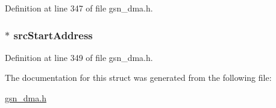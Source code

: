 Definition at line 347 of file gsn\_\-dma.h.

\hypertarget{a00051_a52e21e4c98a2c8c53e8894906c522c2b}{
\subsubsection[{srcStartAddress}]{$\ast$ {\bf srcStartAddress}}}
\label{a00051_a52e21e4c98a2c8c53e8894906c522c2b}


Definition at line 349 of file gsn\_\-dma.h.



The documentation for this struct was generated from the following file:\begin{DoxyCompactItemize}
\item 
\hyperlink{a00484}{gsn\_\-dma.h}\end{DoxyCompactItemize}
